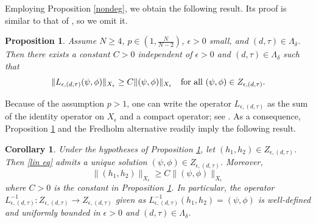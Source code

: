 \documentclass[reqno]{amsart}
\newtheorem{proposition}[theorem]{Proposition}
\newtheorem{cor}[theorem]{Corollary}
\theoremstyle{remark}
\newcommand{\ep}{\epsilon}
\renewcommand{\(}{\left(}
\renewcommand{\)}{\right)}
\numberwithin{equation}{section}
\begin{document}
Employing Proposition \ref{nondeg}, we obtain the following result. Its proof is similar to that of \cite[Proposition 4.2]{KP}, so we omit it.
\begin{proposition}\label{lin prop}
Assume $N \ge 4$, $p \in (1,\frac{N}{N-2})$, $\ep > 0$ small, and $(d,\tau) \in \Lambda_\delta$. Then there exists a constant $C > 0$ independent of $\ep > 0$ and $(d,\tau) \in \Lambda_\delta$ such that
\[\|L_{\ep,(d,\tau)}(\psi,\phi)\|_{X_\ep} \ge C\|(\psi,\phi)\|_{X_\ep} \quad \textup{for all } (\psi,\phi) \in Z_{\ep,(d,\tau)}.\]
\end{proposition}
\noindent Because of the assumption $p > 1$, one can write the operator $L_{\ep,(d,\tau)}$ as the sum of the identity operator on $X_\ep$ and a compact operator; see \cite[Remark 4.1]{KP}.
As a consequence, Proposition \ref{lin prop} and the Fredholm alternative readily imply the following result.
\begin{cor}\label{lin cor}
Under the hypotheses of Proposition \ref{lin prop}, let $(h_1,h_2) \in Z_{\ep,(d,\tau)}$. Then \eqref{lin eq} admits a unique solution $(\psi,\phi) \in Z_{\ep,(d,\tau)}$. Moreover,
\[\|(h_1,h_2)\|_{X_\ep} \ge C\|(\psi,\phi)\|_{X_\ep}\]
where $C > 0$ is the constant in Proposition \ref{lin prop}. In particular, the operator $L_{\ep,(d,\tau)}^{-1}: Z_{\ep,(d,\tau)} \to Z_{\ep,(d,\tau)}$
given as $L_{\ep,(d,\tau)}^{-1}(h_1,h_2) = (\psi,\phi)$ is well-defined and uniformly bounded in $\ep > 0$ and $(d,\tau) \in \Lambda_\delta$.
\end{cor}
\end{document}
